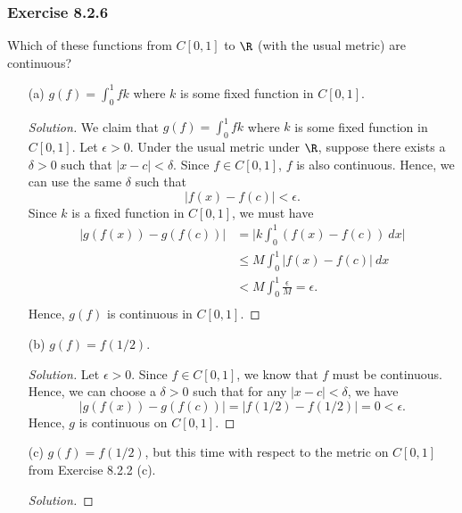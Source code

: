 \subsubsection{Exercise 8.2.6} Which of these functions from \( C[0,1] \) to \( \R  \) (with the usual metric) are continuous? 
\begin{enumerate}
    \item[(a)] \( g(f) = \int_{ 0 }^{ 1 } f k  \) where \( k   \) is some fixed function in \( C[0,1]  \).
        \begin{proof}[Solution]
            We claim that \( g(f) = \int_{ 0 }^{ 1 }  fk  \) where \(  k  \) is some fixed function in \( C[0,1] \). Let \( \epsilon > 0  \). Under the usual metric under \( \R  \), suppose there exists a \( \delta > 0  \) such that \( | x -c  | < \delta  \). Since \( f \in C[0,1]  \), \( f  \) is also continuous. Hence, we can use the same \( \delta \) such that 
            \[  | f(x) - f(c)  | < \epsilon. \] Since \( k  \) is a fixed function in \( C[0,1]  \), we must have 
            \begin{align*}
                | g(f(x)) - g(f(c))  | &= \Big| k \int_{ 0 }^{ 1 } ( f(x) - f(c))  \ dx   \Big| \\
                                       &\leq M \int_{ 0 }^{ 1 }  | f(x) - f(c)  | \ dx \tag{\( k  \) is bounded} \\
                                       &< M \int_{ 0 }^{ 1 }  \frac{ \epsilon  }{ M   }  = \epsilon. \\ 
            \end{align*}
            Hence, \( g(f)  \) is continuous in \( C[0,1] \).
        \end{proof}
    \item[(b)] \( g(f) = f(1/2) \).
        \begin{proof}[Solution]
            Let \( \epsilon > 0   \). Since \( f \in C[0,1] \), we know that \( f  \) must be continuous. Hence, we can choose a \( \delta > 0  \) such that for any \( | x -c  | < \delta  \), we have
            \[  | g(f(x)) - g(f(c))  | = | f(1/2) - f(1/2)  | = 0 < \epsilon. \]
            Hence, \( g  \) is continuous on \( C[0,1] \).
        \end{proof}
    \item[(c)] \( g(f) = f(1/2)  \), but this time with respect to the metric on \( C[0,1]  \) from Exercise 8.2.2 (c).
        \begin{proof}[Solution]
        
        \end{proof}
\end{enumerate}



